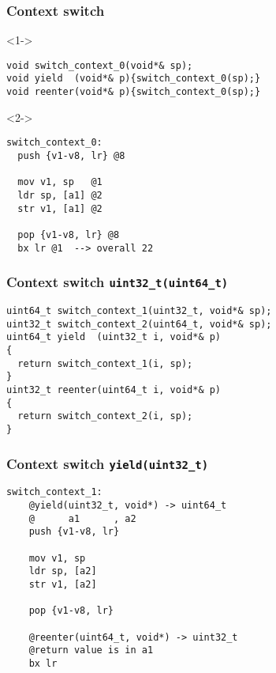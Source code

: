 \documentclass{beamer}
\begin{document}
\begin{frame}[fragile]
\frametitle{Context switch}
\begin{block}<1->{}
\begin{lstlisting}
void switch_context_0(void*& sp);
void yield  (void*& p){switch_context_0(sp);}
void reenter(void*& p){switch_context_0(sp);}

\end{lstlisting}
\end{block}

\begin{block}<2->{}
\begin{lstlisting}[language=ASM]
switch_context_0:
  push {v1-v8, lr} @8
  
  mov v1, sp   @1
  ldr sp, [a1] @2
  str v1, [a1] @2

  pop {v1-v8, lr} @8
  bx lr @1  --> overall 22
\end{lstlisting}
\end{block}
\end{frame}

\begin{frame}[fragile]
\frametitle{Context switch \lstinline{uint32_t(uint64_t)}}
\begin{block}{}
\begin{lstlisting}[basicstyle=\small]
uint64_t switch_context_1(uint32_t, void*& sp);
uint32_t switch_context_2(uint64_t, void*& sp);
uint64_t yield  (uint32_t i, void*& p)
{
  return switch_context_1(i, sp);
}
uint32_t reenter(uint64_t i, void*& p)
{
  return switch_context_2(i, sp);
}
\end{lstlisting}
\end{block}
\end{frame}

\begin{frame}[fragile]
\frametitle{Context switch \lstinline{yield(uint32_t)}}
\begin{block}{}
\begin{lstlisting}[language=ASM, basicstyle=\small]
switch_context_1:
    @yield(uint32_t, void*) -> uint64_t
    @      a1      , a2
    push {v1-v8, lr} 

    mov v1, sp
    ldr sp, [a2]
    str v1, [a2]

    pop {v1-v8, lr}

    @reenter(uint64_t, void*) -> uint32_t
    @return value is in a1
    bx lr
\end{lstlisting}
\end{block}
\end{frame}
\end{document}

